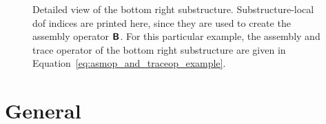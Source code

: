 \begin{figure}[h!]
  \begin{center}
    
    \caption[Simple discretized problem - detail substructure 3]{Detailed view of the bottom right substructure. Substructure-local dof indices are printed here, since they are used to create the assembly operator $\boldsymbol{\mathsf{B}}$. For this particular example, the assembly and trace operator of the bottom right substructure are given in Equation~\eqref{eq:asmop_and_traceop_example}.}
    \label{fig:simple_discretized_example_detail_sub}
  \end{center}
\end{figure}



\section{General}

